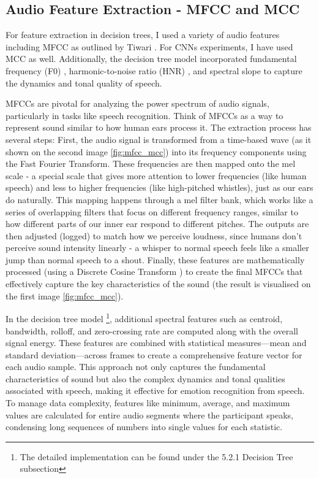\subsection{Audio Feature Extraction - MFCC and MCC}

For feature extraction in decision trees, I used a variety of audio features including MFCC as outlined by Tiwari \cite{tiwari2010mfcc}. For CNNs experiments, I have used MCC as well. Additionally, the decision tree model incorporated fundamental frequency (F0) \cite{wiki:f0}, harmonic-to-noise ratio (HNR) \cite{hnr}, and spectral slope \cite{wiki:spec_slope} to capture the dynamics and tonal quality of speech.

MFCCs are pivotal for analyzing the power spectrum of audio signals, particularly in tasks like speech recognition. Think of MFCCs as a way to represent sound similar to how human ears process it. The extraction process has several steps: First, the audio signal is transformed from a time-based wave (as it shown on the second image \ref{fig:mfcc_mcc}) into its frequency components using the Fast Fourier Transform. These frequencies are then mapped onto the mel scale - a special scale that gives more attention to lower frequencies (like human speech) and less to higher frequencies (like high-pitched whistles), just as our ears do naturally. This mapping happens through a mel filter bank, which works like a series of overlapping filters that focus on different frequency ranges, similar to how different parts of our inner ear respond to different pitches. The outputs are then adjusted (logged) to match how we perceive loudness, since humans don't perceive sound intensity linearly - a whisper to normal speech feels like a smaller jump than normal speech to a shout. Finally, these features are mathematically processed (using a Discrete Cosine Transform \cite{wikidct}) to create the final MFCCs that effectively capture the key characteristics of the sound (the result is visualised on the first image \ref{fig:mfcc_mcc}).

In the decision tree model \footnote{The detailed implementation can be found under the 5.2.1 Decision Tree subsection}, additional spectral features such as centroid, bandwidth, rolloff, and zero-crossing rate are computed along with the overall signal energy. These features are combined with statistical measures—mean and standard deviation—across frames to create a comprehensive feature vector for each audio sample. This approach not only captures the fundamental characteristics of sound but also the complex dynamics and tonal qualities associated with speech, making it effective for emotion recognition from speech. To manage data complexity, features like minimum, average, and maximum values are calculated for entire audio segments where the participant speaks, condensing long sequences of numbers into single values for each statistic.

